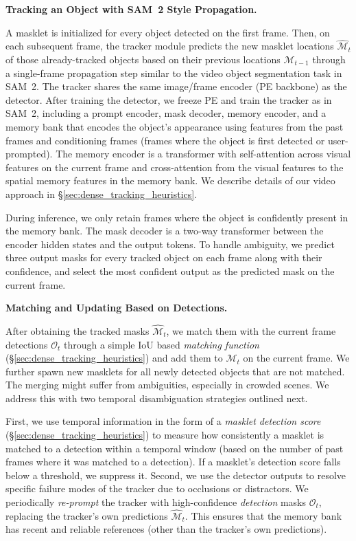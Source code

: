 \documentclass[]{fairmeta}
\newcommand{\samtwo}{SAM~2\xspace}
\renewcommand{\paragraph}[1]{%
	\noindent\textbf{#1.}\noindent\xspace%
}
\begin{document}
\paragraph{Tracking an Object with \samtwo Style Propagation}
A masklet is initialized for every object detected on the first frame. Then, on each subsequent frame, the tracker module predicts the new masklet locations $\mathcal{\hat{M}}_{t}$ of those already-tracked objects based on their previous locations $\mathcal{M}_{t-1}$ through a single-frame propagation step similar to the video object segmentation task in \samtwo. %
The tracker shares the same image/frame encoder (PE backbone) as the detector. After training the detector, we freeze PE and train the tracker as in \samtwo, including a prompt encoder, mask decoder, memory encoder, and a memory bank that encodes the object's appearance using features from the past frames and conditioning frames (frames where the object is first detected or user-prompted). The memory encoder is a transformer with self-attention across visual features on the current frame and cross-attention from the visual features to the spatial memory features in the memory bank. We describe details of our video approach in \S\ref{sec:dense_tracking_heuristics}.

During inference, we only retain frames where the object is confidently present in the memory bank. The mask decoder is a two-way transformer between the encoder hidden states and the output tokens. To handle ambiguity, we predict three output masks for every tracked object on each frame along with their confidence, and select the most confident output as the predicted mask on the current frame.




\paragraph{Matching and Updating Based on Detections}
After obtaining the tracked masks $\mathcal{\hat{M}}_{t}$, we match them with the current frame detections $\mathcal{O}_{t}$ through a simple IoU based \emph{matching function} (\S\ref{sec:dense_tracking_heuristics}) and add them to $\mathcal{M}_{t}$ on the current frame. We further spawn new masklets for all newly detected objects that are not matched. The merging might suffer from ambiguities, especially in crowded scenes. We address this with two temporal disambiguation strategies outlined next.

First, we use temporal information in the form of a \textit{masklet detection score} (\S\ref{sec:dense_tracking_heuristics}) to measure how consistently a masklet is matched to a detection within a temporal window (based on the number of past frames where it was matched to a detection). If a masklet's detection score falls below a threshold, we suppress it.
Second, we use the detector outputs to resolve specific failure modes of the tracker due to occlusions or distractors. We periodically \textit{re-prompt} the tracker with high-confidence \textit{detection} masks $\mathcal{O}_{t}$, replacing the tracker's own predictions $\mathcal{\hat{M}}_{t}$. This ensures that the memory bank has recent and reliable references (other than the tracker's own predictions). %
\end{document}
